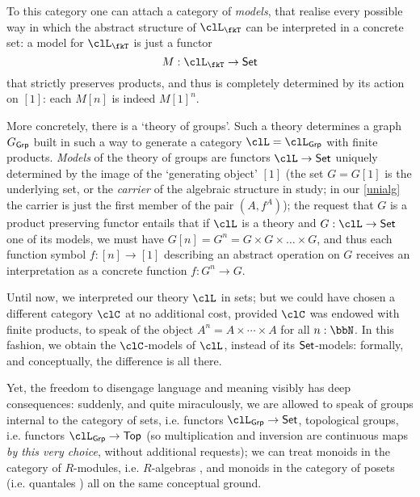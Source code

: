 To this category one can attach a category of \emph{models}, that realise every possible way in which the abstract structure of $\clL_\fkT$ can be interpreted in a concrete set: a model for $\clL_\fkT$ is just a functor 
\[
M : \clL_\fkT \to \Set
\]
that strictly preserves products, and thus is completely determined by its action on $[1]$: each $M[n]$ is indeed $M[1]^n$.

\begin{remark}\label{rmk_explicit_theoer}
    More concretely, there is a `theory of groups'. Such a theory determines a graph $G_{\mathsf{Grp}}$ built in such a way to generate a category $\clL=\clL_{\cate{Grp}}$ with finite products. \emph{Models} of the theory of groups are functors $\clL \to \Set$ uniquely determined by the image of the `generating object' $[1]$ (the set $G=G[1]$ is the underlying set, or the \emph{carrier} of the algebraic structure in study; in our \autoref{unialg} the carrier is just the first member of the pair $(A,f^A)$); the request that $G$ is a product preserving functor entails that if $\clL$ is a theory and $G: \clL \to \Set$ one of its models, we must have $G[n]=G^n = G \times G \times\dots\times G$, and thus each function symbol $f: [n]\to [1]$ describing an abstract operation on $G$ receives an interpretation as a concrete function $f: G^n \to G$.
\end{remark}
Until now, we interpreted our theory $\clL$ in sets; but we could have chosen a different category $\clC$ at no additional cost, provided $\clC$ was endowed with finite products, to speak of the object $A^n = A\times \cdots\times A$ for all $n: \bbN$. In this fashion, we obtain the $\clC$-models of $\clL$, instead of its $\mathsf{Set}$-models: formally, and conceptually, the difference is all there.

Yet, the freedom to disengage language and meaning visibly has deep consequences: suddenly, and quite miraculously, we are allowed to speak of groups internal to the category of sets, i.e. functors $\clL_{\cate{Grp}} \to \Set$, topological groups, i.e. functors $\clL_{\cate{Grp}} \to \cate{Top}$ (so multiplication and inversion are continuous maps \emph{by this very choice}, without additional requests); we can treat monoids in the category of $R$-modules, i.e. $R$-algebras \cite[IV]{book337527}, and monoids in the category of posets (i.e. quantales \cite{Paseka2000}) all on the same conceptual ground.

